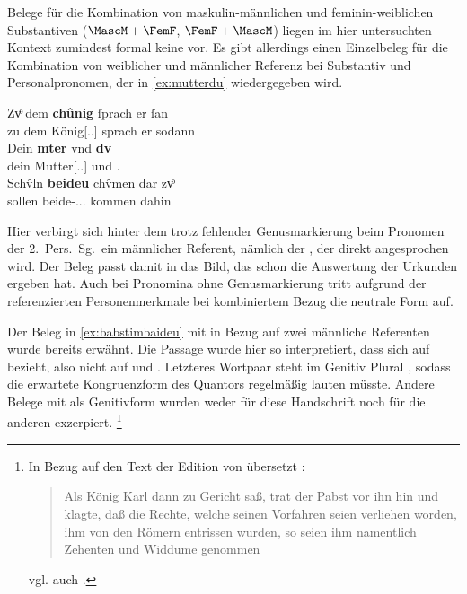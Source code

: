 Belege für die Kombination von maskulin-männlichen und feminin-weiblichen
Substantiven ($\MascM+\FemF$, $\FemF+\MascM$) liegen im hier untersuchten
Kontext zumindest formal keine vor. Es gibt allerdings einen Einzelbeleg für
die Kombination von weiblicher und männlicher Referenz bei Substantiv und
Personal\-pronomen, der in \cref{ex:mutterdu} wiedergegeben wird.

\begin{exe}
\ex\label{ex:mutterdu}
	\gll Zvͦ dem \textbf{chûnig} ſprach er ſan \textelp{} \\
		zu dem König[\Dat.\Sg.\MascM] sprach er sodann {} \\
\sn \gll Dein \textbf{mter} vnd \textbf{dv} \\
		dein Mutter[\Nom.\Sg.\FemF] und \Ssg\subM.\Nom{} \\
\sn \gll Schv̂ln \textbf{beideu} chv̂men {dar zvͦ} \\
		sollen beide-\Nom.\Pl.\NeutMF.\St{} kommen dahin \\
	\begin{taggedline}{\parencite[\pno~23\rc, 5--14]{kc:B1}}
		\trans {}
	\end{taggedline}
\end{exe}

Hier verbirgt sich hinter dem   trotz fehlender
Genusmarkierung beim Pronomen der 2.\ Pers.\ Sg.\ ein männlicher Referent,
nämlich der  , der direkt angesprochen wird. Der Beleg
passt damit in das Bild, das schon die Auswertung der Urkunden ergeben hat.
Auch bei Pro\-nomina ohne Genusmarkierung tritt aufgrund der referenzierten Personenmerkmale bei kombiniertem Bezug die
neutrale Form auf.

\label{phsec:babstimbaideu}
Der Beleg in \cref{ex:babstimbaideu} mit  in Bezug auf zwei
männliche Referenten wurde bereits erwähnt. Die Passage wurde hier so
interpretiert, dass sich   auf   bezieht, also nicht auf  
\autocite[vgl. zur  Definition][\pno~]{lexer:mhdhwb} und
 . Letzteres Wortpaar steht im Genitiv Plural
\autocite[vgl.][341]{paul2007}, sodass die erwartete Kongruenzform des
Quantors regelmäßig   lauten müsste. Andere Belege
mit  als Genitivform wurden weder für diese Handschrift noch für
die anderen exzerpiert.%
%
	\footnote{In Bezug auf den Text der Edition von
	\nosh\citet{schroeder1895} übersetzt \citet[249]{mayer1874}:
	\blockquote{Als König Karl dann zu Gericht saß, trat der Pabst vor ihn hin
	und klagte, daß die Rechte, welche seinen Vorfahren seien verliehen worden,
	ihm von den Römern entrissen wurden, so seien ihm namentlich Zehenten und
	Widdume genommen}; vgl. auch \citet[83]{weis2022}.}

